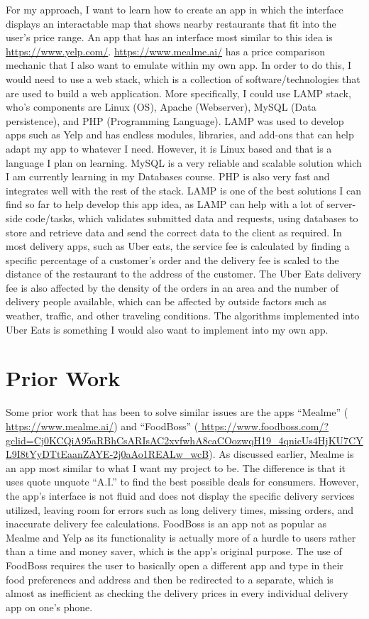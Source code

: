 \documentclass[10pt,twocolumn,letterpaper]{article}
\begin{document}
For my approach, I want to learn how to create an app in which the interface displays an interactable map that shows nearby restaurants that fit into the user’s price range. An app that has an interface most similar to this idea is \url{ https://www.yelp.com/}. \url{ https://www.mealme.ai/} has a price comparison mechanic that I also want to emulate within my own app. In order to do this, I would need to use a web stack, which is a collection of software/technologies that are used to build a web application. More specifically, I could use LAMP stack, who’s components are Linux (OS), Apache (Webserver), MySQL (Data persistence), and PHP (Programming Language). LAMP was used to develop apps such as Yelp and has endless modules, libraries, and add-ons that can help adapt my app to whatever I need. However, it is Linux based and that is a language I plan on learning. MySQL is a very reliable and scalable solution which I am currently learning in my Databases course. PHP is also very fast and integrates well with the rest of the stack. LAMP is one of the best solutions I can find so far to help develop this app idea, as LAMP can help with a lot of server-side code/tasks, which validates submitted data and requests, using databases to store and retrieve data and send the correct data to the client as required. 
In most delivery apps, such as Uber eats, the service fee is calculated by finding a specific percentage of a customer’s order and the delivery fee is scaled to the distance of the restaurant to the address of the customer. The Uber Eats delivery fee is also affected by the density of the orders in an area and the number of delivery people available, which can be affected by outside factors such as weather, traffic, and other traveling conditions. The algorithms implemented into Uber Eats is something I would also want to implement into my own app.

\section{Prior Work}
\label{sec:Prior Work}

Some prior work that has been to solve similar issues are the apps “Mealme” (\url{ https://www.mealme.ai/}) and “FoodBoss” (\url { https://www.foodboss.com/?gclid=Cj0KCQiA95aRBhCsARIsAC2xvfwhA8caCOozwqH19_4qnicUs4HjKU7CYL9I8tYyDTtEaanZAYE-2j0aAo1REALw_wcB}). As discussed earlier, Mealme is an app most similar to what I want my project to be. The difference is that it uses quote unquote “A.I.” to find the best possible deals for consumers. However, the app’s interface is not fluid and does not display the specific delivery services utilized, leaving room for errors such as long delivery times, missing orders, and inaccurate delivery fee calculations. FoodBoss is an app not as popular as Mealme and Yelp as its functionality is actually more of a hurdle to users rather than a time and money saver, which is the app’s original purpose. The use of FoodBoss requires the user to basically open a different app and type in their food preferences and address and then be redirected to a separate, which is almost as inefficient as checking the delivery prices in every individual delivery app on one’s phone.
\end{document}
